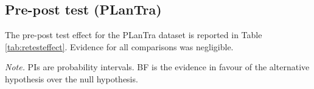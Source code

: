 \clearpage
\makeatletter
\efloat@restorefloats
\makeatother


\begin{appendix}
\section{}
\hypertarget{pre-post-test-plantra}{%
\subsection{Pre-post test (PLanTra)}\label{pre-post-test-plantra}}

The pre-post test effect for the PLanTra dataset is reported in Table
\ref{tab:retesteffect}. Evidence for all comparisons was negligible.

\begin{center}
\begin{ThreePartTable}

\begin{TableNotes}[para]
\normalsize{\textit{Note.} PIs are probability intervals. BF is the evidence in favour of the alternative hypothesis over the null hypothesis.}
\end{TableNotes}

\footnotesize{

}
\end{ThreePartTable}
\end{center}
\end{appendix}
